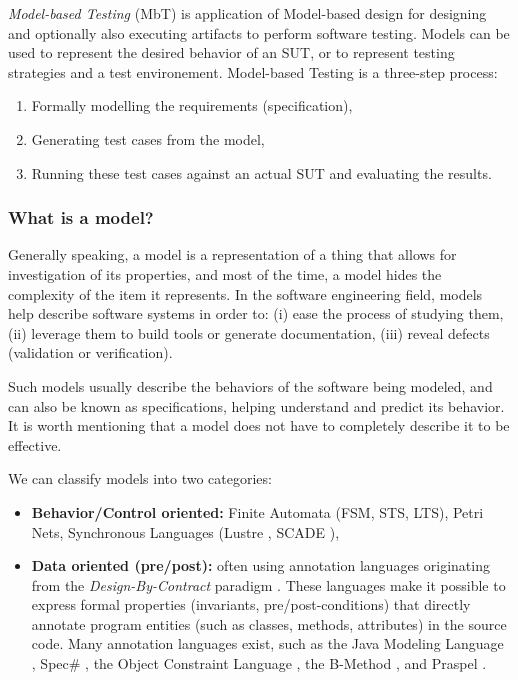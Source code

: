 \textit{Model-based Testing} (MbT) is application of Model-based
design for designing and optionally also executing artifacts to
perform software testing. Models can be used to represent the
desired behavior of an SUT, or to represent testing strategies
and a test environement. Model-based Testing is a three-step
process:

\begin{enumerate}
\item Formally modelling the requirements (specification),

\item Generating test cases from the model,

\item Running these test cases against an actual SUT and
evaluating the results.
\end{enumerate}

\subsubsection{What is a model?}
\label{sec:related:testing:model}

Generally speaking, a model is a representation of a thing that
allows for investigation of its properties, and most of the time,
a model hides the complexity of the item it represents. In the
software engineering field, models help describe software systems
in order to: (i) ease the process of studying them, (ii) leverage
them to build tools or generate documentation, (iii) reveal
defects (validation or verification).

Such models usually describe the behaviors of the software being
modeled, and can also be known as specifications, helping
understand and predict its behavior. It is worth mentioning that
a model does not have to completely describe it to be effective.

We can classify models into two categories:

\begin{itemize}
\item \textbf{Behavior/Control oriented:} Finite Automata (FSM,
STS, LTS), Petri Nets, Synchronous Languages (Lustre
\cite{lustre:ieee}, SCADE
\cite{LeSergent:2011:SCF:2188575.2188578}),

\item \textbf{Data oriented (pre/post):} often using annotation
languages originating from the \textit{Design-By-Contract}
paradigm \cite{Meyer:1992:ADC:618974.619797}. These languages
make it possible to express formal properties (invariants,
pre/post-conditions) that directly annotate program entities
(such as classes, methods, attributes) in the source code. Many
annotation languages exist, such as the Java Modeling Language
\cite{jml}, Spec\# \cite{117852}, the Object Constraint Language
\cite{Warmer:1998:OCL:291202}, the B-Method
\cite{Lano:1996:BLM:525749}, and Praspel
\cite{Enderlin:2011:PSL:2075545.2075551}.
\end{itemize}

